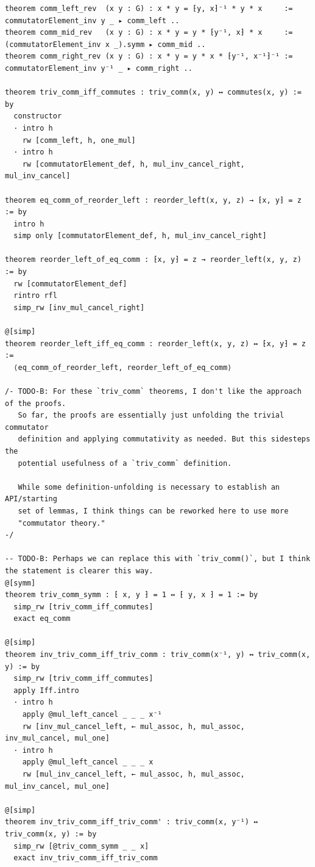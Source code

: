 \begin{Verbatim}
theorem comm_left_rev  (x y : G) : x * y = ⁅y, x⁆⁻¹ * y * x     := commutatorElement_inv y _ ▸ comm_left ..
theorem comm_mid_rev   (x y : G) : x * y = y * ⁅y⁻¹, x⁆ * x     := (commutatorElement_inv x _).symm ▸ comm_mid ..
theorem comm_right_rev (x y : G) : x * y = y * x * ⁅y⁻¹, x⁻¹⁆⁻¹ := commutatorElement_inv y⁻¹ _ ▸ comm_right ..

theorem triv_comm_iff_commutes : triv_comm(x, y) ↔ commutes(x, y) := by
  constructor
  · intro h
    rw [comm_left, h, one_mul]
  · intro h
    rw [commutatorElement_def, h, mul_inv_cancel_right, mul_inv_cancel]

theorem eq_comm_of_reorder_left : reorder_left(x, y, z) → ⁅x, y⁆ = z := by
  intro h
  simp only [commutatorElement_def, h, mul_inv_cancel_right]

theorem reorder_left_of_eq_comm : ⁅x, y⁆ = z → reorder_left(x, y, z) := by
  rw [commutatorElement_def]
  rintro rfl
  simp_rw [inv_mul_cancel_right]

@[simp]
theorem reorder_left_iff_eq_comm : reorder_left(x, y, z) ↔ ⁅x, y⁆ = z :=
  ⟨eq_comm_of_reorder_left, reorder_left_of_eq_comm⟩

/- TODO-B: For these `triv_comm` theorems, I don't like the approach of the proofs.
   So far, the proofs are essentially just unfolding the trivial commutator
   definition and applying commutativity as needed. But this sidesteps the
   potential usefulness of a `triv_comm` definition.

   While some definition-unfolding is necessary to establish an API/starting
   set of lemmas, I think things can be reworked here to use more
   "commutator theory."
-/

-- TODO-B: Perhaps we can replace this with `triv_comm()`, but I think the statement is clearer this way.
@[symm]
theorem triv_comm_symm : ⁅ x, y ⁆ = 1 ↔ ⁅ y, x ⁆ = 1 := by
  simp_rw [triv_comm_iff_commutes]
  exact eq_comm

@[simp]
theorem inv_triv_comm_iff_triv_comm : triv_comm(x⁻¹, y) ↔ triv_comm(x, y) := by
  simp_rw [triv_comm_iff_commutes]
  apply Iff.intro
  · intro h
    apply @mul_left_cancel _ _ _ x⁻¹
    rw [inv_mul_cancel_left, ← mul_assoc, h, mul_assoc, inv_mul_cancel, mul_one]
  · intro h
    apply @mul_left_cancel _ _ _ x
    rw [mul_inv_cancel_left, ← mul_assoc, h, mul_assoc, mul_inv_cancel, mul_one]

@[simp]
theorem inv_triv_comm_iff_triv_comm' : triv_comm(x, y⁻¹) ↔ triv_comm(x, y) := by
  simp_rw [@triv_comm_symm _ _ x]
  exact inv_triv_comm_iff_triv_comm


\end{Verbatim}
